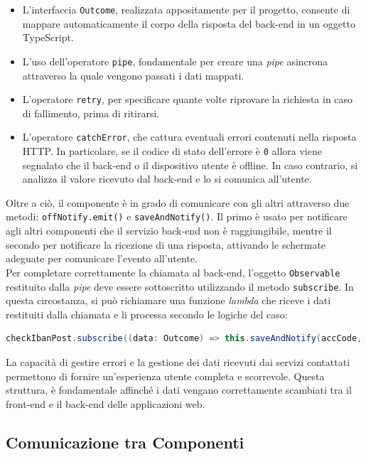 \begin{itemize}
    \item L’interfaccia \texttt{Outcome}, realizzata appositamente per il progetto, consente di mappare automaticamente il corpo della risposta del back-end in un oggetto TypeScript.
    \item L'uso dell'operatore \texttt{pipe}, fondamentale per creare una \textit{pipe} asincrona attraverso la quale vengono passati i dati mappati.
    \item L'operatore \texttt{retry}, per specificare quante volte riprovare la richiesta in caso di fallimento, prima di ritirarsi.
    \item L'operatore \texttt{catchError}, che cattura eventuali errori contenuti nella risposta HTTP. In particolare, se il codice di stato dell'errore è \texttt{0} allora viene segnalato che il back-end o il dispositivo utente è offline. In caso contrario, si analizza il valore ricevuto dal back-end e lo si comunica all'utente.
\end{itemize}
Oltre a ciò, il componente è in grado di comunicare con gli altri attraverso due metodi: \texttt{offNotify.emit()} e \texttt{saveAndNotify()}. Il primo è usato per notificare agli altri componenti che il servizio back-end non è raggiungibile, mentre il secondo per notificare la ricezione di una risposta, attivando le schermate adeguate per comunicare l’evento all’utente.\\
Per completare correttamente la chiamata al back-end, l’oggetto \texttt{Observable} restituito dalla \textit{pipe} deve essere sottoscritto utilizzando il metodo \texttt{subscribe}. In questa circostanza, si può richiamare una funzione \textit{lambda} che riceve i dati restituiti dalla chiamata e li processa secondo le logiche del caso:
\begin{lstlisting}[language=Java, caption=Sottoscrizione della chiamata HTTP verso il back-end.]
checkIbanPost.subscribe((data: Outcome) => this.saveAndNotify(accCode, subCode, data));
\end{lstlisting}
La capacità di gestire errori e la gestione dei dati ricevuti dai servizi contattati permettono di fornire un’esperienza utente completa e scorrevole. Questa struttura, è fondamentale affinché i dati vengano correttamente scambiati tra il front-end e il back-end delle applicazioni web.

\subsection{Comunicazione tra Componenti}


